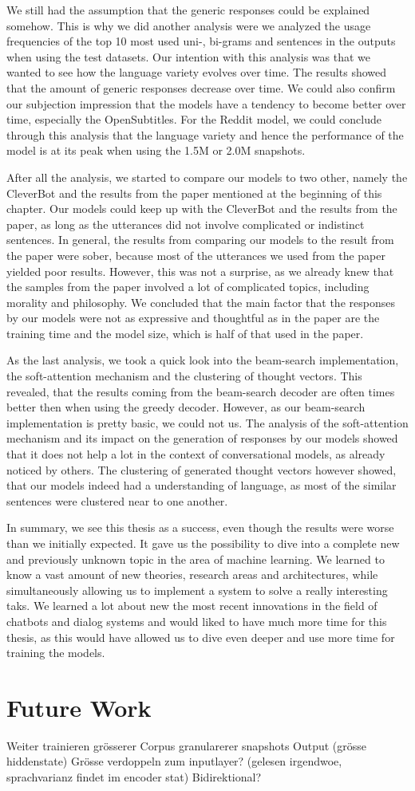 We still had the assumption that the generic responses could be explained somehow. This is why we did another analysis were we analyzed the usage frequencies of the top 10 most used uni-, bi-grams and sentences in the outputs when using the test datasets. Our intention with this analysis was that we wanted to see how the language variety evolves over time. The results showed that the amount of generic responses decrease over time. We could also confirm our subjection impression that the models have a tendency to become better over time, especially the OpenSubtitles. For the Reddit model, we could conclude through this analysis that the language variety and hence the performance of the model is at its peak when using the 1.5M or 2.0M snapshots.

After all the analysis, we started to compare our models to two other, namely the CleverBot and the results from the paper mentioned at the beginning of this chapter. Our models could keep up with the CleverBot and the results from the paper, as long as the utterances did not involve complicated or indistinct sentences. In general, the results from comparing our models to the result from the paper were sober, because most of the utterances we used from the paper yielded poor results. However, this was not a surprise, as we already knew that the samples from the paper involved a lot of complicated topics, including morality and philosophy. We concluded that the main factor that the responses by our models were not as expressive and thoughtful as in the paper are the training time and the model size, which is half of that used in the paper.

As the last analysis, we took a quick look into the beam-search implementation, the soft-attention mechanism and the clustering of thought vectors. This revealed, that the results coming from the beam-search decoder are often times better then when using the greedy decoder. However, as our beam-search implementation is pretty basic, we could not us. The analysis of the soft-attention mechanism and its impact on the generation of responses by our models showed that it does not help a lot in the context of conversational models, as already noticed by others. The clustering of generated thought vectors however showed, that our models indeed had a understanding of language, as most of the similar sentences were clustered near to one another.

In summary, we see this thesis as a success, even though the results were worse than we initially expected. It gave us the possibility to dive into a complete new and previously unknown topic in the area of machine learning. We learned to know a vast amount of new theories, research areas and architectures, while simultaneously allowing us to implement a system to solve a really interesting taks. We learned a lot about new the most recent innovations in the field of chatbots and dialog systems and would liked to have much more time for this thesis, as this would have allowed us to dive even deeper and use more time for training the models.

\chapter{Future Work}
Weiter trainieren
grösserer Corpus
granularerer snapshots
Output (grösse hiddenstate) Grösse verdoppeln zum inputlayer? (gelesen irgendwoe, sprachvarianz findet im encoder stat)
Bidirektional?